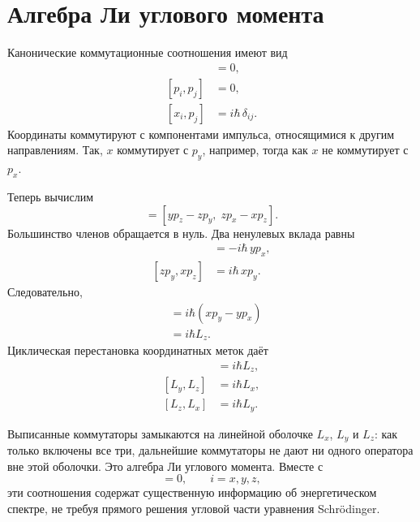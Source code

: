 \section{Алгебра Ли углового момента}

Канонические коммутационные соотношения имеют вид
\begin{align}
[x_i,x_j]&=0,\\
[p_i,p_j]&=0,\\
[x_i,p_j]&=i\hbar\,\delta_{ij}.
\end{align}
Координаты коммутируют с компонентами импульса, относящимися к другим направлениям. Так, \(x\) коммутирует с \(p_y\), например, тогда как \(x\) не коммутирует с \(p_x\).

Теперь вычислим
\begin{equation}
[L_x,L_y]
=
[yp_z-zp_y,\;zp_x-xp_z].
\end{equation}
Большинство членов обращается в нуль. Два ненулевых вклада равны
\begin{align}
[yp_z,zp_x]&=-i\hbar\,yp_x,\\
[zp_y,xp_z]&=i\hbar\,xp_y.
\end{align}
Следовательно,
\begin{align}
[L_x,L_y]
&=i\hbar\left(xp_y-yp_x\right)\\
&=i\hbar L_z.
\end{align}
Циклическая перестановка координатных меток даёт
\begin{align}
[L_x,L_y]&=i\hbar L_z,\\
[L_y,L_z]&=i\hbar L_x,\\
[L_z,L_x]&=i\hbar L_y.
\end{align}

\begin{classroomqa}
\end{classroomqa}

Выписанные коммутаторы замыкаются на линейной оболочке \(L_x\), \(L_y\) и \(L_z\): как только включены все три, дальнейшие коммутаторы не дают ни одного оператора вне этой оболочки. Это алгебра Ли углового момента. Вместе с
\begin{equation}
[H,L_i]=0,
\qquad i=x,y,z,
\end{equation}
эти соотношения содержат существенную информацию об энергетическом спектре, не требуя прямого решения угловой части уравнения Schr\"odinger.

